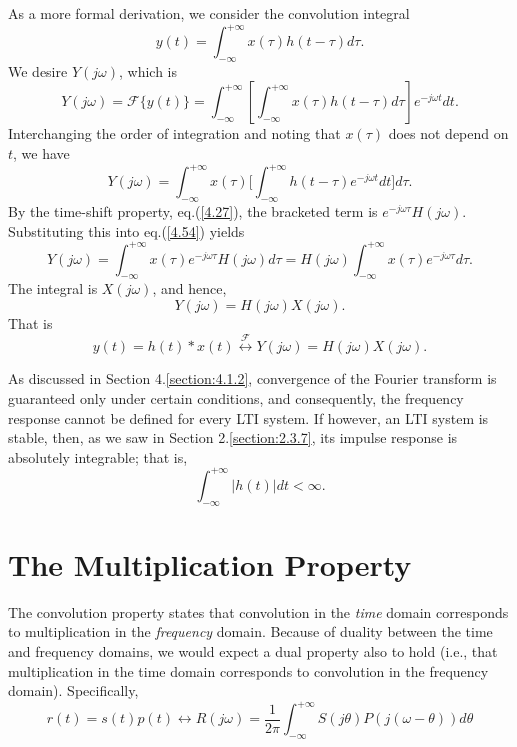 \documentclass[a4paper,twoside]{book}
\begin{document}
As a more formal derivation, we consider the convolution integral
\begin{equation}
    y(t) = \int_{-\infty}^{+\infty}x(\tau)h(t-\tau)d\tau.
    \label{4.52}
\end{equation}
We desire $Y(j\omega)$, which is
\begin{equation}
    Y(j\omega) = \mathcal{F}\{y(t)\} = \int_{-\infty}^{+\infty}\left[\int_{-\infty}^{+\infty}x(\tau)h(t-\tau)d\tau\right]e^{-j\omega t}dt.
    \label{4.53}
\end{equation}
Interchanging the order of integration and noting that $x(\tau)$ does not depend on $t$, we have
\begin{equation}
    Y(j\omega)=\int_{-\infty}^{+\infty}x(\tau)\biggl[\int_{-\infty}^{+\infty}h(t-\tau)e^{-j\omega t}dt\biggr]d\tau.
    \label{4.54}
\end{equation}
By the time-shift property, eq.\;(\ref{4.27}), the bracketed term is $e^{-j\omega\tau}H(j\omega)$. Substituting this into eq.\;(\ref{4.54}) yields
\begin{equation}
    Y(j\omega)=\int_{-\infty}^{+\infty}x(\tau)e^{-j\omega\tau}H(j\omega)d\tau=H(j\omega)\int_{-\infty}^{+\infty}x(\tau)e^{-j\omega\tau}d\tau.
    \label{4.55}
\end{equation}
The integral is $X(j\omega)$, and hence, $$Y(j\omega)=H(j\omega)X(j\omega).$$ That is
\begin{equation}
    \boxed{y(t) = h(t)*x(t)\overset{\mathcal{F}}{\longleftrightarrow}Y(j\omega) = H(j\omega)X(j\omega).}
    \label{4.56}
\end{equation}

As discussed in Section 4.\ref{section:4.1.2}, convergence of the Fourier transform is guaranteed only under certain conditions, and consequently, the frequency response cannot be defined for every LTI system. If however, an LTI system is stable, then, as we saw in Section 2.\ref{section:2.3.7}, its impulse response is absolutely integrable; that is,
\begin{equation}
    \int_{-\infty}^{+\infty}|h(t)|dt<\infty.
    \label{4.57}
\end{equation}

\section{The Multiplication Property}

The convolution property states that convolution in the \textit{time} domain corresponds to multiplication in the \textit{frequency} domain. Because of duality between the time and frequency domains, we would expect a dual property also to hold (i.e., that multiplication in the time domain corresponds to convolution in the frequency domain). Specifically,
\begin{equation}
    \boxed{r(t)=s(t)p(t)\longleftrightarrow R(j\omega)=\frac1{2\pi}\int_{-\infty}^{+\infty}S(j\theta)P(j(\omega-\theta))d\theta}
    \label{4.70}
\end{equation}
\end{document}

